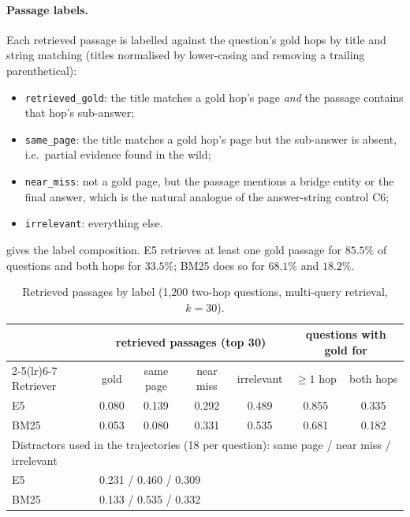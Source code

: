 \paragraph{Passage labels.} Each retrieved passage is labelled against the question's gold hops by title and string matching (titles normalised by lower-casing and removing a trailing parenthetical):
\begin{itemize}
  \item \texttt{retrieved\_gold}: the title matches a gold hop's page \emph{and} the passage contains that hop's sub-answer;
  \item \texttt{same\_page}: the title matches a gold hop's page but the sub-answer is absent, i.e.\ partial evidence found in the wild;
  \item \texttt{near\_miss}: not a gold page, but the passage mentions a bridge entity or the final answer, which is the natural analogue of the answer-string control C6;
  \item \texttt{irrelevant}: everything else.
\end{itemize}
 gives the label composition. E5 retrieves at least one gold passage for $85.5\%$ of questions and both hops for $33.5\%$; BM25 does so for $68.1\%$ and $18.2\%$.

\begin{table}[t]
\centering\small
\begin{tabular}{lcccccc}
\toprule
& \multicolumn{4}{c}{retrieved passages (top 30)} & \multicolumn{2}{c}{questions with gold for} \\
\cmidrule(lr){2-5}\cmidrule(lr){6-7}
Retriever & gold & same page & near miss & irrelevant & $\ge1$ hop & both hops \\
\midrule
E5 & 0.080 & 0.139 & 0.292 & 0.489 & 0.855 & 0.335 \\
BM25 & 0.053 & 0.080 & 0.331 & 0.535 & 0.681 & 0.182 \\
\midrule
\multicolumn{7}{l}{Distractors used in the trajectories (18 per question): same page / near miss / irrelevant} \\
E5 & \multicolumn{6}{l}{0.231 / 0.460 / 0.309} \\
BM25 & \multicolumn{6}{l}{0.133 / 0.535 / 0.332} \\
\bottomrule
\end{tabular}
\caption{Retrieved passages by label (1{,}200 \musique{} two-hop questions, multi-query retrieval, $k=30$).}
\label{tab:estb-retrieval}
\end{table}

